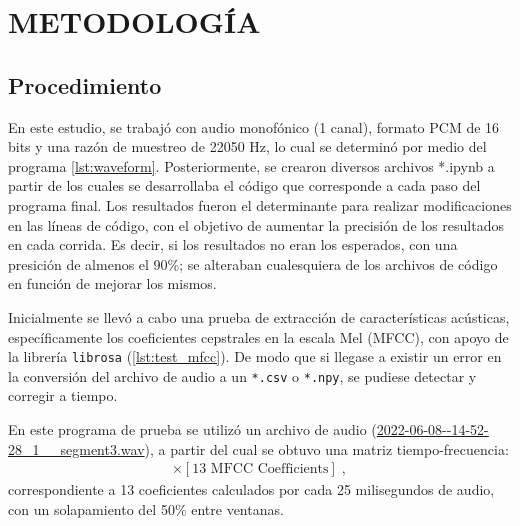 \documentclass[12pt]{report}
\newenvironment{tightmulticols}{%
  \begin{multicols}{2}
  \setlength{\parskip}{0pt}
  \setlength{\parindent}{0em}
  \linespread{1}\selectfont
}{%
  \end{multicols}
}
\begin{document}

\pagebreak
\chapter{METODOLOGÍA}
\vspace{-3em}

\begin{tightmulticols}

\section{Procedimiento}

\par En este estudio, se trabajó con audio monofónico (1 canal), formato PCM de 16 bits y una razón de muestreo de 22050 Hz, lo cual se determinó por medio del programa \ref{lst:waveform}. Posteriormente, se crearon diversos archivos *.ipynb a partir de los cuales se desarrollaba el código que corresponde a cada paso del programa final. Los resultados fueron el determinante para realizar modificaciones en las líneas de código, con el objetivo de aumentar la precisión de los resultados en cada corrida. Es decir, si los resultados no eran los esperados, con una presición de almenos el 90\%; se alteraban cualesquiera de los archivos de código en función de mejorar los mismos.

\par Inicialmente se llevó a cabo una prueba de extracción de características acústicas, específicamente los coeficientes cepstrales en la escala Mel (MFCC), con apoyo de la librería \texttt{librosa} (\ref{lst:test_mfcc}). De modo que si llegase a existir un error en la conversión del archivo de audio a un \texttt{*.csv} o \texttt{*.npy}, se pudiese detectar y corregir a tiempo.

\par En este programa de prueba se utilizó un archivo de audio (\url{2022-06-08--14-52-28_1__segment3.wav}), a partir del cual se obtuvo una matriz tiempo-frecuencia:
\begin{align*}
[\text{Time Frames}] \times [\text{13 MFCC Coefficients}] \; ,
\end{align*}
correspondiente a 13 coeficientes calculados por cada 25 milisegundos de audio, con un solapamiento del 50\% entre ventanas.


\end{tightmulticols}
\end{document}
